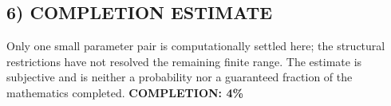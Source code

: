 \subsection{6) COMPLETION ESTIMATE}
Only one small parameter pair is computationally settled here; the structural restrictions have not resolved the remaining finite range. The estimate is subjective and is neither a probability nor a guaranteed fraction of the mathematics completed.
\textbf{COMPLETION: 4\%}
